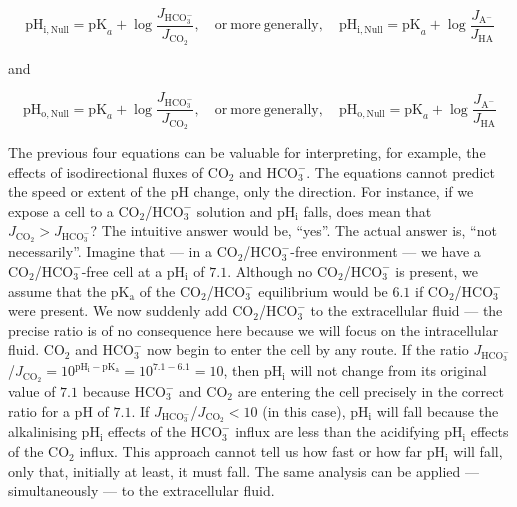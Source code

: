 \documentclass[fleqn,10pt]{physiome}
\begin{document}
\begin{equation}
\mathrm{pH_{i,Null}}=\mathrm{pK}_a+\log \dfrac{J_\mathrm{HCO_3^-}}{J_\mathrm{CO_2}},\quad \mathrm{or~ more~ generally},\quad \mathrm{pH_{i,Null}}=\mathrm{pK}_a+\log \dfrac{J_\mathrm{A^-}}{J_\mathrm{HA}}
\label{eqn:phnull3}
\end{equation}

and

\begin{equation}
\mathrm{pH_{o,Null}}=\mathrm{pK}_a+\log \dfrac{J_\mathrm{HCO_3^-}}{J_\mathrm{CO_2}},\quad \mathrm{or~ more~ generally},\quad \mathrm{pH_{o,Null}}=\mathrm{pK}_a+\log \dfrac{J_\mathrm{A^-}}{J_\mathrm{HA}}
\label{eqn:phnull4}
\end{equation}
 
The previous four equations can be valuable for interpreting, for example, the effects of isodirectional fluxes of $\mathrm{CO_2}$ and $\mathrm{HCO_3^-}$. The equations cannot predict the speed or extent of the $\mathrm{pH}$ change, only the direction. For instance, if we expose a cell to a $\mathrm{CO_2}$/$\mathrm{HCO_3^-}$ solution and $\mathrm{pH_i}$ falls, does mean that $J_\mathrm{CO_2}>J_\mathrm{HCO_3^-}$? The intuitive answer would be, ``yes''. The actual answer is, ``not necessarily''. Imagine that --- in a $\mathrm{CO_2}$/$\mathrm{HCO_3^-}$-free environment --- we have a $\mathrm{CO_2}$/$\mathrm{HCO_3^-}$-free cell at a $\mathrm{pH_i}$ of $7.1$. Although no $\mathrm{CO_2}$/$\mathrm{HCO_3^-}$ is present, we assume that the $\mathrm{pK_a}$ of the $\mathrm{CO_2}$/$\mathrm{HCO_3^-}$ equilibrium would be $6.1$ if $\mathrm{CO_2}$/$\mathrm{HCO_3^-}$ were present. We now suddenly add $\mathrm{CO_2}$/$\mathrm{HCO_3^-}$ to the extracellular fluid --- the precise ratio is of no consequence here because we will focus on the intracellular fluid. $\mathrm{CO_2}$ and $\mathrm{HCO_3^-}$ now begin to enter the cell by any route. If the ratio $J_\mathrm{HCO_3^-}$/$J_\mathrm{CO_2}= 10^{\mathrm{pH_i-pK_a}} = 10^{7.1-6.1} = 10$, then $\mathrm{pH_i}$  will not change from its original value of $7.1$ because $\mathrm{HCO_3^-}$ and $\mathrm{CO_2}$ are entering the cell precisely in the correct ratio for a $\mathrm{pH}$ of $7.1$. If $J_\mathrm{HCO_3^-}$/$J_\mathrm{CO_2}<10$ (in this case), $\mathrm{pH_i}$ will fall because the alkalinising $\mathrm{pH_i}$ effects of the $\mathrm{HCO_3^-}$ influx are less than the acidifying $\mathrm{pH_i}$ effects of the $\mathrm{CO_2}$ influx. This approach cannot tell us how fast or how far $\mathrm{pH_i}$ will fall, only that, initially at least, it must fall. The same analysis can be applied --- simultaneously --- to the extracellular fluid.
\end{document}
